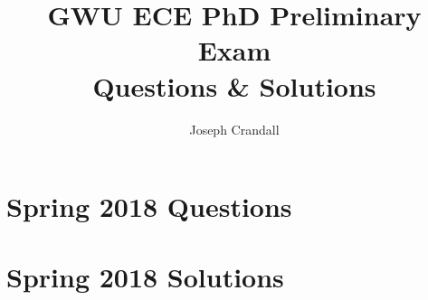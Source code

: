 
\usepackage{algorithm, algpseudocode, chemformula, color, gensymb, siunitx, soul, subfiles}
\usepackage[a4paper]{geometry}

\title{GWU ECE PhD Preliminary Exam\\ Questions \& Solutions}
\author{Joseph Crandall}


\maketitle

\section{Spring 2018 Questions}


\section{Spring 2018 Solutions}










